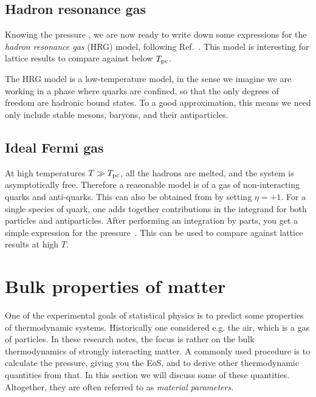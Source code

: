 \subsection{Hadron resonance gas}\label{sec:HRG}

Knowing the pressure , we are now ready to write down
some expressions for the {\it hadron resonance gas} (HRG) model,
following Ref.~\cite{karsch_probing_2011}. This model is interesting for lattice
results to compare against below $T_{\rm pc}$. 

The HRG model is a low-temperature model, in the sense we imagine we are working
in a phase where quarks are confined, so that the only degrees of freedom are
hadronic bound states. To a good approximation, this means we need only include
stable mesons, baryons, and their antiparticles.

\subsection{Ideal Fermi gas}\label{sec:fermi}

At high temperatures $T\gg T_{\rm pc}$, all the hadrons are melted, and the system is
asymptotically free. Therefore a reasonable model is of a gas of non-interacting
quarks and anti-quarks. This can also be obtained from 
by setting $\eta=+1$. For a single species of quark, one adds together
contributions in the integrand for both particles and antiparticles.
After performing an integration by parts, you get a simple expression for the
pressure~\cite{hegde_lattice_2008}. 
This can be used to compare against lattice results at high $T$.

\section{Bulk properties of matter}

One of the experimental goals of statistical physics is to predict some
properties of thermodynamic systems. Historically one considered e.g.
the air, which is a gas of particles. In these research notes, the focus
is rather on the bulk thermodynamics of strongly interacting matter.
A commonly used procedure is to calculate the pressure, giving
you the EoS, and to derive other thermodynamic quantities from that.
In this section we will discuss some of these quantities.
Altogether, they are often referred to as {\it material
parameters}.

